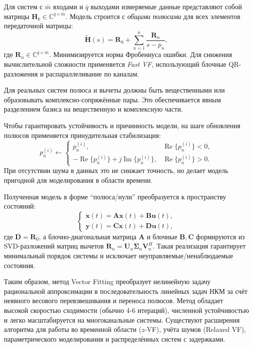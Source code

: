 Для систем с $\bar{m}$ входами и $\bar{q}$ выходами измеряемые данные представляют собой матрицы $\mathbf{H}_k \in \mathbb{C}^{\bar{q}\times\bar{m}}$. Модель строится с \textit{общими полюсами} для всех элементов передаточной матрицы:
\begin{equation}
    \tilde{\mathbf{H}}(s) = \mathbf{R}_0 + \sum_{n=1}^{\bar{n}} \frac{\mathbf{R}_n}{s - p_n},
\end{equation}
где $\mathbf{R}_n \in \mathbb{C}^{\bar{q}\times\bar{m}}$. Минимизируется норма Фробениуса ошибки. Для снижения вычислительной сложности применяется \textit{Fast VF}, использующий блочные QR-разложения и распараллеливание по каналам.

Для реальных систем полюса и вычеты должны быть вещественными или образовывать комплексно-сопряжённые пары. Это обеспечивается явным разделением базиса на вещественную и комплексную части. 

Чтобы гарантировать устойчивость и причинность модели, на шаге обновления полюсов применяется принудительная стабилизация:
\begin{equation}
    p_n^{(i)} \leftarrow \begin{cases}
        p_n^{(i)}, & \operatorname{Re}\{p_n^{(i)}\} < 0,\\
        -\operatorname{Re}\{p_n^{(i)}\} + j \operatorname{Im}\{p_n^{(i)}\}, & \operatorname{Re}\{p_n^{(i)}\} > 0.
    \end{cases}
\end{equation}
При отсутствии шума в данных это не снижает точность, но делает модель пригодной для моделирования в области времени.

Полученная модель в форме \enquote{полюса/нули} преобразуется к пространству состояний:
\begin{equation}
    \begin{cases}
        \dot{\mathbf{x}}(t) = \mathbf{A}\mathbf{x}(t) + \mathbf{B}\mathbf{u}(t),\\
        \mathbf{y}(t) = \mathbf{C}\mathbf{x}(t) + \mathbf{D}\mathbf{u}(t),
    \end{cases}
\end{equation}
где $\mathbf{D}=\mathbf{R}_0$, а блочно-диагональная матрица $\mathbf{A}$ и блочные $\mathbf{B}, \mathbf{C}$ формируются из SVD-разложений матриц вычетов $\mathbf{R}_n = \mathbf{U}_n \bm{\Sigma}_n \mathbf{V}_n^H$. Такая реализация гарантирует минимальный порядок системы и исключает неуправляемые/ненаблюдаемые состояния.

Таким образом, метод Vector Fitting преобразует нелинейную задачу рациональной аппроксимации в последовательность линейных задач НКМ за счёт неявного весового перевзвешивания и переноса полюсов. Метод обладает высокой скоростью сходимости (обычно 4-6 итераций), численной устойчивостью и легко масштабируется на многоканальные системы. Существуют расширения алгоритма для работы во временной области ($z$-VF), учёта шумов (Relaxed VF), параметрического моделирования и распределённых систем с задержками.


